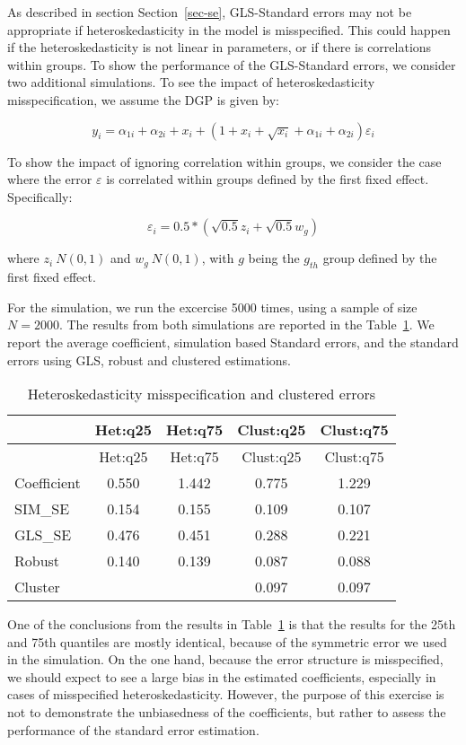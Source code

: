\documentclass[
  authoryear,
  review,
  1p]{elsarticle}
\begin{document}
As described in section Section~\ref{sec-se}, GLS-Standard errors may
not be appropriate if heteroskedasticity in the model is misspecified.
This could happen if the heteroskedasticity is not linear in parameters,
or if there is correlations within groups. To show the performance of
the GLS-Standard errors, we consider two additional simulations. To see
the impact of heteroskedasticity misspecification, we assume the DGP is
given by:

\[y_i = \alpha_{1i} + \alpha_{2i} + x_i + (1+x_i + \sqrt{x_i} +\alpha_{1i} + \alpha_{2i} ) \varepsilon_i
\]

To show the impact of ignoring correlation within groups, we consider
the case where the error \(\varepsilon\) is correlated within groups
defined by the first fixed effect. Specifically:

\[\varepsilon_i =0.5*(\sqrt{0.5} z_i + \sqrt{0.5} w_g)\]

where \(z_i~N(0,1)\) and \(w_g~N(0,1)\), with \(g\) being the \(g_{th}\)
group defined by the first fixed effect.

For the simulation, we run the excercise 5000 times, using a sample of
size \(N=2000\). The results from both simulations are reported in the
Table~\ref{tbl-sim2}. We report the average coefficient, simulation
based Standard errors, and the standard errors using GLS, robust and
clustered estimations.

\begin{longtable}[]{@{}lcccc@{}}
\caption{Heteroskedasticity misspecification and clustered
errors}\label{tbl-sim2}\tabularnewline
\toprule\noalign{}
& Het:q25 & Het:q75 & Clust:q25 & Clust:q75 \\
\midrule\noalign{}
\endfirsthead
\toprule\noalign{}
& Het:q25 & Het:q75 & Clust:q25 & Clust:q75 \\
\midrule\noalign{}
\endhead
\bottomrule\noalign{}
\endlastfoot
Coefficient & 0.550 & 1.442 & 0.775 & 1.229 \\
SIM\_SE & 0.154 & 0.155 & 0.109 & 0.107 \\
GLS\_SE & 0.476 & 0.451 & 0.288 & 0.221 \\
Robust & 0.140 & 0.139 & 0.087 & 0.088 \\
Cluster & & & 0.097 & 0.097 \\
\end{longtable}

One of the conclusions from the results in Table~\ref{tbl-sim2} is that
the results for the 25th and 75th quantiles are mostly identical,
because of the symmetric error we used in the simulation. On the one
hand, because the error structure is misspecified, we should expect to
see a large bias in the estimated coefficients, especially in cases of
misspecified heteroskedasticity. However, the purpose of this exercise
is not to demonstrate the unbiasedness of the coefficients, but rather
to assess the performance of the standard error estimation.
\end{document}
